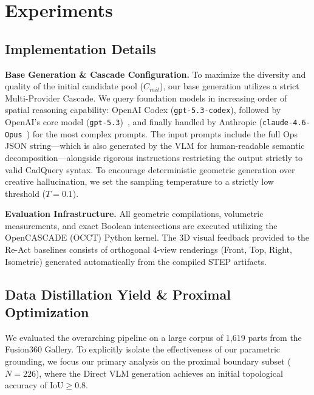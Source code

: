 \section{Experiments}
\label{sec:experiments}

\subsection{Implementation Details}

\noindent\textbf{Base Generation \& Cascade Configuration.}
To maximize the diversity and quality of the initial candidate pool ($C_{init}$), our base generation utilizes a strict Multi-Provider Cascade. We query foundation models in increasing order of spatial reasoning capability: OpenAI Codex (\texttt{gpt-5.3-codex}), followed by OpenAI's core model (\texttt{gpt-5.3})~\cite{openai2025codex}, and finally handled by Anthropic (\texttt{claude-4.6-Opus}~\cite{anthropic2026opus}) for the most complex prompts. The input prompts include the full Ops JSON string—which is also generated by the VLM for human-readable semantic decomposition—alongside rigorous instructions restricting the output strictly to valid CadQuery syntax. To encourage deterministic geometric generation over creative hallucination, we set the sampling temperature to a strictly low threshold ($T=0.1$).

\noindent\textbf{Evaluation Infrastructure.}
All geometric compilations, volumetric measurements, and exact Boolean intersections are executed utilizing the OpenCASCADE (OCCT) Python kernel. The 3D visual feedback provided to the Re-Act baselines consists of orthogonal 4-view renderings (Front, Top, Right, Isometric) generated automatically from the compiled STEP artifacts.

\subsection{Data Distillation Yield \& Proximal Optimization}

We evaluated the overarching pipeline on a large corpus of 1,619 parts from the Fusion360 Gallery. To explicitly isolate the effectiveness of our parametric grounding, we focus our primary analysis on the proximal boundary subset ($N=226$), where the Direct VLM generation achieves an initial topological accuracy of $\text{IoU} \ge 0.8$.

